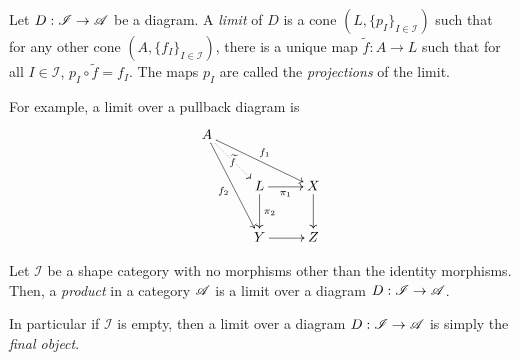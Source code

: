 \begin{definition}[Limit]
    Let $D:\mathscr I\to\mathscr{A}$ be a diagram. A \textit{limit} of $D$ is a cone $(L, \{p_I\}_{I\in\mathscr I})$ such that for any other cone $(A,\{f_I\}_{I\in\mathscr I})$, there is a unique map $\widetilde f: A\to L$ such that for all $I\in\mathscr I$, $p_I\circ\widetilde f = f_I$. The maps $p_I$ are called the \textit{projections} of the limit.
\end{definition}

For example, a limit over a pullback diagram is 
\begin{equation*}
    \xymatrix{
        A\ar[rrd]^{f_1}\ar[rdd]_{f_2}\ar@{.>}[rd]|-{\widetilde f}\\
        & L\ar[r]_-{\pi_1}\ar[d]^{\pi_2} & X\ar[d]\\
        & Y\ar[r] & Z
    }
\end{equation*}

\begin{definition}[Product]
    Let $\mathscr I$ be a shape category with no morphisms other than the identity morphisms. Then, a \textit{product} in a category $\mathscr{A}$ is a limit over a diagram $D:\mathscr I\to\mathscr{A}$.
\end{definition}

In particular if $\mathscr I$ is empty, then a limit over a diagram $D:\mathscr I\to\mathscr{A}$ is simply the \textit{final object}.